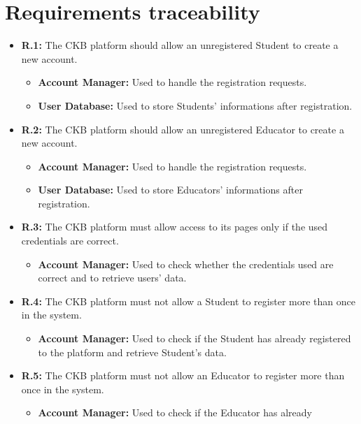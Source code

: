 \documentclass{article}
\begin{document}
{\section{Requirements traceability}
\begin{itemize}
    \item \textbf{R.1:} The CKB platform should allow an
        unregistered Student to create a new account.
        \begin{itemize}
            \item \textbf{Account Manager:} Used to handle the registration requests.
            \item \textbf{User Database:} Used to store Students' informations after registration.
        \end{itemize}
    \item \textbf{R.2:} The CKB platform should allow an
        unregistered Educator to create a new account.
        \begin{itemize}
            \item \textbf{Account Manager:} Used to handle the registration requests.
            \item \textbf{User Database:} Used to store Educators' informations after registration.
        \end{itemize}
    \item \textbf{R.3:} The CKB platform must allow access to its pages only if the used credentials are correct.
        \begin{itemize}
            \item \textbf{Account Manager:} Used to check whether the credentials used are correct and to retrieve users' data.
        \end{itemize}
    \item \textbf{R.4:} The CKB platform must not allow a Student to register more than once in the system.
          \begin{itemize}
              \item \textbf{Account Manager:} Used to check if the Student has 
              already registered to the platform and retrieve Student's data.
          \end{itemize}
    \item \textbf{R.5:} The CKB platform must not allow an Educator to register more than once in the system.
          \begin{itemize}
              \item \textbf{Account Manager:} Used to check if the Educator has already

\end{itemize}
\end{itemize}}
\end{document}

